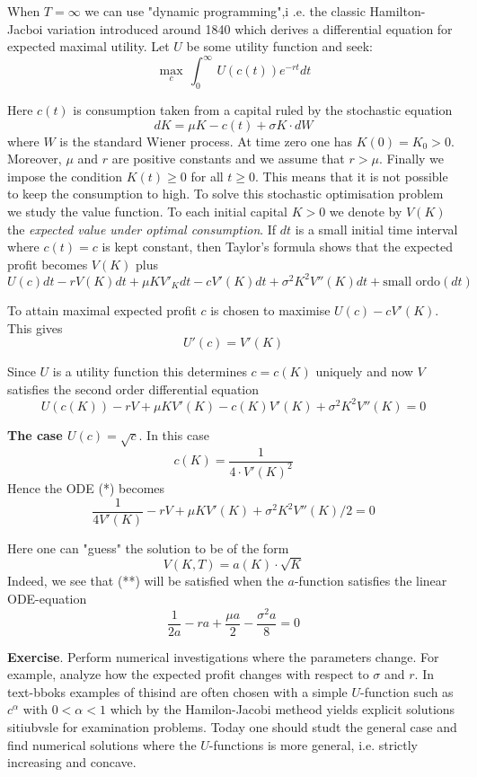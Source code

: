 \documentclass[12pt]{amsart}
\begin{document}
\bigskip

\noindent
When $T=\infty$
we can use "dynamic programming",i .e. the classic Hamilton-Jacboi
variation introduced around 1840 which  derives a differential equation for 
expected maximal utility. Let $U$ be some utility function and  seek:
\[
\max_c\,\int_0^\infty\, U(c(t))e^{-rt} dt\tag{*}
\]

\noindent
Here
$c(t)$ is consumption  taken from a capital ruled by the stochastic 
equation
\[
dK=\mu K-c(t)+\sigma K\cdot dW\tag{1}
\]
where $W$ is the standard Wiener process.
At time zero one has $K(0)=K_0>0$.
Moreover, $\mu$ and $r$ are  positive constants and we assume that 
$r>\mu$. Finally we impose the  condition
$K(t)\geq 0$ for all $t\geq 0$.
This means that it is not possible to keep the consumption to high.
To  solve this stochastic optimisation problem
we study the value function.
To each initial capital
$K>0$  we denote by $V(K)$ the \emph{expected value under optimal consumption}.
If $dt$ is a small initial time interval where $c(t)=c$
is kept constant, then Taylor's formula shows that
the expected profit becomes $V(K)$ plus
\[
 U(c)dt-rV(K)dt+\mu KV'_K dt-cV'(K)dt+
 \sigma^2K^2 V''(K)dt+\text{small ordo}(dt)\tag{2}
\]

\noindent
To attain maximal expected profit $c$ is chosen
to
maximise $U(c)-cV'(K)$.
This gives
\[
U'(c)=V'(K)\tag{3}
\]

\noindent
Since $U$ is a utility function this determines
$c=c(K)$ uniquely  and now  $V$ satisfies the second order
differential equation
\[
 U(c(K))-rV+\mu KV'(K) -c(K)V'(K)+
 \sigma^2K^2 V''(K)=0\tag{*}
\]

\medskip


\noindent
{\bf The case $U(c)=\sqrt{c}$}. In this case 
\[
c(K)=\frac{1}{4\cdot V'(K)^2}
\]
Hence the ODE  (*) becomes
\[
\frac{1}{4V'(K)}-rV+\mu K V'(K)+\sigma^2K^2V''(K)/2=0\tag{**}
\]

\medskip

\noindent
Here  one can "guess" the solution to be of the form
\[
V(K,T)=a(K)\cdot \sqrt{K}\tag{i}
\]
Indeed, we see that (**) will be satisfied when the $a$-function
satisfies the linear ODE-equation
\[
\frac{1}{2a}-ra+\frac{\mu a}{2}-\frac{\sigma^2a}{8}=0\tag{ii}
\]

\bigskip

\noindent
{\bf {Exercise}}.
Perform numerical investigations where
the parameters change. For example,  analyze 
how the expected profit changes with respect to $\sigma$ and $r$.
In text-bboks examples of thisind are
often chosen with a simple $U$-function such as $c^\alpha$ with
$0<\alpha<1$ which by the Hamilon-Jacobi metheod yields explicit solutions sitiubvsle for
examination problems.
Today one should studt the general case and find numerical solutions where
the $U$-functions is  more  general, i.e. strictly increasing and concave.







  










 
 
 
  \enddocument
\end{document}
